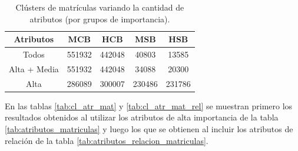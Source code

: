 \begin{table}[H]
\centering
\caption{Clústers de matrículas variando la cantidad de atributos (por grupos de importancia).}
\label{tab:cl_mat}
\begin{tabular}{|c|c|c|c|c|}
\hline
\textbf{Atributos} & \textbf{MCB} & \textbf{HCB} & \textbf{MSB} & \textbf{HSB}   \\ \hline
Todos & 551932 & 442048 & 40803 & 13585 \\ \hline
Alta + Media & 551932 & 442048 & 34088 & 20300 \\ \hline
Alta & 286089 & 300007 & 230486 & 231786 \\ \hline
\end{tabular}
\end{table}

En las tablas \ref{tab:cl_atr_mat} y \ref{tab:cl_atr_mat_rel} se muestran primero los resultados obtenidos al utilizar los atributos de alta importancia de la tabla \ref{tab:atributos_matriculas} y luego los que se obtienen al incluir los atributos de relación de la tabla \ref{tab:atributos_relacion_matriculas}.

\begin{table}[H]
\centering
\caption{Comparativa de clústers de matrículas por atributo.}
\label{tab:cl_atr_mat}
\end{table}


